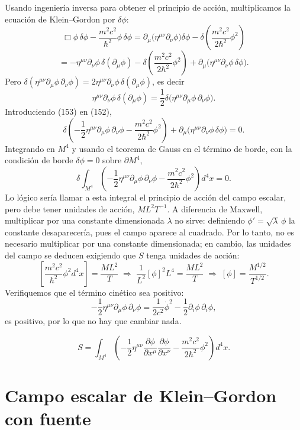Usando ingeniería inversa para obtener el principio de acción,
multiplicamos la ecuación de Klein--Gordon por $\delta\phi$:
\[
\Box\phi\,\delta\phi-\frac{m^2c^2}{\hbar^2}\phi\,\delta\phi=\partial_\mu
\big(\eta^{\mu\nu}\partial_\nu\phi\big)\delta\phi-\delta\left(\frac{m^2c^2}
{2\hbar^2}\phi^2\right)
\]
\[
=-\eta^{\mu\nu}\partial_\nu\phi\,\delta(\partial_\mu\phi)-\delta\left(
\frac{m^2c^2}{2\hbar^2}\phi^2\right)+\partial_\mu\big(\eta^{\mu\nu}
\partial_\nu\phi\,\delta\phi\big). \tag{152}
\]
Pero $\delta(\eta^{\mu\nu}\partial_\mu\phi\,\partial_\nu\phi)=2\eta^{\mu\nu}
\partial_\nu\phi\,\delta(\partial_\mu\phi)$, es decir
\[
\eta^{\mu\nu}\partial_\nu\phi\,\delta(\partial_\mu\phi)=\frac12\delta
\big(\eta^{\mu\nu}\partial_\mu\phi\,\partial_\nu\phi\big). \tag{153}
\]
Introduciendo (153) en (152),
\[
\delta\left(-\frac12\eta^{\mu\nu}\partial_\mu\phi\,\partial_\nu\phi-
\frac{m^2c^2}{2\hbar^2}\phi^2\right)+\partial_\mu\big(\eta^{\mu\nu}
\partial_\nu\phi\,\delta\phi\big)=0. \tag{154}
\]
Integrando en $M^4$ y usando el teorema de Gauss en el término de
borde, con la condición de borde $\delta\phi=0$ sobre $\partial M^4$,
\[
\delta\int_{M^4}\left(-\frac12\eta^{\mu\nu}\partial_\mu\phi\,\partial_\nu
\phi-\frac{m^2c^2}{2\hbar^2}\phi^2\right)d^4x=0. \tag{155}
\]
Lo lógico sería llamar a esta integral el principio de acción del campo
escalar, pero debe tener unidades de acción, $ML^2T^{-1}$. A diferencia
de Maxwell, multiplicar por una constante dimensionada $\lambda$ no
sirve: definiendo $\phi'=\sqrt\lambda\,\phi$ la constante desaparecería,
pues el campo aparece al cuadrado. Por lo tanto, no es necesario
multiplicar por una constante dimensionada; en cambio, las unidades del
campo se deducen exigiendo que $S$ tenga unidades de acción:
\[
\left[\frac{m^2c^2}{\hbar^2}\phi^2d^4x\right]=\frac{ML^2}{T}
\;\Longrightarrow\; \frac{1}{L^2}[\phi]^2L^4=\frac{ML^2}{T}
\;\Longrightarrow\; [\phi]=\frac{M^{1/2}}{T^{1/2}}. \tag{156}
\]
Verifiquemos que el término cinético sea positivo:
\[
-\frac12\eta^{\mu\nu}\partial_\mu\phi\,\partial_\nu\phi=\frac{1}{2c^2}
\dot\phi^2-\frac12\partial_i\phi\,\partial_i\phi,
\]
es positivo, por lo que no hay que cambiar nada.

\begin{definicion}
\[
S=\int_{M^4}\left(-\frac12\eta^{\mu\nu}\frac{\partial\phi}{\partial x^\mu}
\frac{\partial\phi}{\partial x^\nu}-\frac{m^2c^2}{2\hbar^2}\phi^2\right)
d^4x. \tag{157}
\]
\end{definicion}

\section{Campo escalar de Klein--Gordon con fuente}

